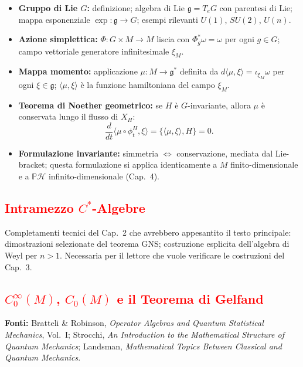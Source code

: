 \documentclass[12pt, a4paper]{article}
\newcommand{\fonti}[1]{%
	\begin{fontebox}
		\textcolor{fontecolor}{\footnotesize\textbf{Fonti:} #1}
	\end{fontebox}%
}
\begin{document}
	\begin{itemize}
		\item \textbf{Gruppo di Lie $G$:} definizione; algebra di Lie $\mathfrak{g} = T_eG$
		con parentesi di Lie; mappa esponenziale $\exp: \mathfrak{g} \to G$; esempi
		rilevanti $U(1)$, $SU(2)$, $U(n)$.
		\item \textbf{Azione simplettica:} $\Phi: G \times M \to M$ liscia con
		$\Phi_g^* \omega = \omega$ per ogni $g \in G$; campo vettoriale generatore
		infinitesimale $\xi_M$.
		\item \textbf{Mappa momento:} applicazione $\mu: M \to \mathfrak{g}^*$ definita da
		$d\langle\mu, \xi\rangle = \iota_{\xi_M}\omega$ per ogni $\xi \in \mathfrak{g}$;
		$\langle\mu, \xi\rangle$ è la funzione hamiltoniana del campo $\xi_M$.
		\item \textbf{Teorema di Noether geometrico:} se $H$ è $G$-invariante, allora $\mu$ è
		conservata lungo il flusso di $X_H$:
		\[
		\frac{d}{dt}\langle\mu \circ \phi_t^H, \xi\rangle = \{\langle\mu,\xi\rangle, H\} = 0.
		\]
		\item \textbf{Formulazione invariante:} simmetria $\Leftrightarrow$ conservazione,
		mediata dal Lie-bracket; questa formulazione si applica identicamente a $M$
		finito-dimensionale e a $\mathbb{P}\mathcal{H}$ infinito-dimensionale (Cap.\ 4).
	\end{itemize}
	
	\subsection{\textcolor{red}{Intramezzo $C^*$-Algebre}}
	
	Completamenti tecnici del Cap.\ 2 che avrebbero appesantito il testo principale:
	dimostrazioni selezionate del teorema GNS; costruzione esplicita dell'algebra di
	Weyl per $n > 1$. Necessaria per il lettore che vuole verificare le costruzioni
	del Cap.\ 3.
	
\subsection{\textcolor{red}{$C_0^\infty(M)$, $C_0(M)$ e il Teorema di Gelfand}}

\fonti{Bratteli \& Robinson, \textit{Operator Algebras and Quantum Statistical
		Mechanics}, Vol.~I; Strocchi, \textit{An Introduction to the Mathematical
		Structure of Quantum Mechanics}; Landsman, \textit{Mathematical Topics
		Between Classical and Quantum Mechanics}.}
\end{document}

